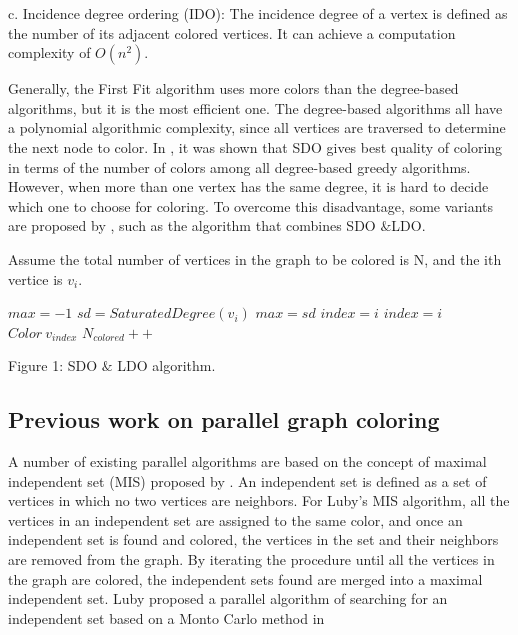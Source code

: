 \documentclass[preprint]{sigplanconf}
\begin{document}
c. Incidence degree ordering (IDO): The incidence degree of a vertex is defined as the number of its adjacent colored vertices. It can achieve a computation complexity of $O(n^2)$\cite{klotz2002graph}.

Generally, the First Fit algorithm uses more colors than the degree-based algorithms, but it is the most efficient one. The degree-based algorithms all have a polynomial algorithmic complexity, since all vertices are traversed to determine the next node to color.  In \cite{gebremedhin1999parallel}, it was shown that SDO gives best quality of coloring in terms of  the number of colors among all degree-based greedy algorithms.   However, when more than one vertex has the same degree, it is hard to decide which one to choose for coloring.  To overcome this disadvantage,  some variants are proposed by  \cite{al2006new}, such as the algorithm that combines SDO $\& $LDO.

\renewcommand{\algorithmicrequire}{\textbf{phase}}
Assume the total number of vertices in the graph to be colored is N,
and the ith vertice is $v_i$.
\begin{algorithm}
\begin{algorithmic}
    \STATE  $ max = -1$
           \STATE $sd = SaturatedDegree(v_i) $
               \STATE $max = sd$
               \STATE $index = i$
           \ENDIF
                 \STATE $index = i$
             \ENDIF
           \ENDIF
        \STATE $ Color \:v_{index} $
        \STATE $N_{colored} ++$
        \ENDIF
    \ENDFOR
\ENDWHILE
\end{algorithmic}
\end{algorithm}


Figure 1:  SDO $\&$ LDO algorithm.

\subsection{Previous work on parallel graph coloring}

A number of existing parallel algorithms are based on the concept of maximal independent set (MIS) proposed by \citet{luby1985simple}. An independent set is defined as a set of vertices in which no two vertices are neighbors. For Luby’s MIS algorithm, all the vertices in an independent set are assigned to the same color, and once an independent set is found and colored, the vertices in the set and their neighbors are removed from the graph. By iterating the procedure until all the vertices in the graph are colored, the independent sets found are merged into a maximal independent set. Luby proposed a parallel algorithm of searching for an independent set based on a Monto Carlo method in \cite{luby1985simple}
\end{document}
